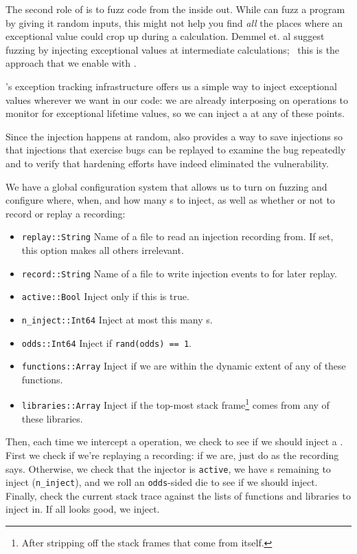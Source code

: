 \documentclass{juliacon}
\begin{document}
The second role of \FT{} is to fuzz code from the inside out.
While can fuzz a program by giving it random inputs, this might not help you find \emph{all} the places where an exceptional value could crop up during a calculation.
Demmel et. al suggest fuzzing by injecting exceptional values at intermediate calculations;~\cite{ddghlllprr-correctness-2022} this is the approach that we enable with \FT{}.

\FT{}'s exception tracking infrastructure offers us a simple way to inject exceptional values wherever we want in our code: we are already interposing on \fp{} operations to monitor for exceptional lifetime values, so we can inject a \NaN{} at any of these points.

Since the injection happens at random, \FT{} also provides a way to save \NaN{} injections so that injections that exercise bugs can be replayed to examine the bug repeatedly and to verify that hardening efforts have indeed eliminated the vulnerability.

We have a global configuration system that allows us to turn on fuzzing and configure where, when, and how many \NaN{}s to inject, as well as whether or not to record or replay a recording:

\begin{itemize}
\item \texttt{replay::String} Name of a file to read an injection recording from. If set, this option makes all others irrelevant.
\item \texttt{record::String} Name of a file to write injection events to for later replay.
\item \texttt{active::Bool} Inject only if this is true.
\item \texttt{n\_inject::Int64} Inject at most this many \NaN{}s.
\item \texttt{odds::Int64} Inject if \texttt{rand(odds) == 1}.
\item \texttt{functions::Array} Inject if we are within the dynamic extent of any of these functions.
\item \texttt{libraries::Array} Inject if the top-most stack frame\footnote{After stripping off the stack frames that come from \FT{} itself.} comes from any of these libraries.
\end{itemize}

Then, each time we intercept a \fp{} operation, we check to see if we should inject a \NaN{}. First we check if we're replaying a recording: if we are, just do as the recording says. Otherwise, we check that the injector is \texttt{active}, we have \NaN{}s remaining to inject (\texttt{n\_inject}), and we roll an \texttt{odds}-sided die to see if we should inject. Finally, check the current stack trace against the lists of functions and libraries to inject in. If all looks good, we inject.
\end{document}
